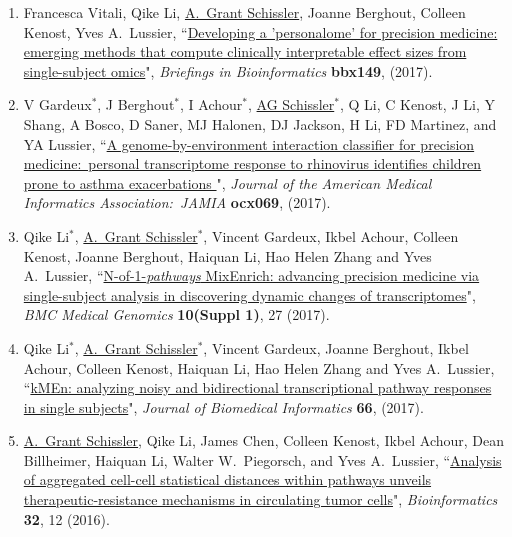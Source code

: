 \documentclass[paper=a4,fontsize=11pt]{scrartcl} %
\newcommand{\PaperEntry}[7]{
		\noindent #1, ``\href{#7}{#2}", \textit{#3} \textbf{#4}, #5 (#6).}
\begin{document}
\begin{enumerate}
\item \PaperEntry{Francesca Vitali, Qike Li, \underline{A.~Grant Schissler}, Joanne Berghout, Colleen Kenost, Yves A.~Lussier}{Developing a 'personalome' for precision medicine: emerging methods that compute clinically interpretable effect sizes from single-subject omics}{Briefings in Bioinformatics}{bbx149}{}{2017}{https://academic.oup.com/bib/advance-article/doi/10.1093/bib/bbx149/4758622}

  \item \PaperEntry{V Gardeux$^{*}$, J Berghout$^{*}$, I Achour$^{*}$, \underline{AG Schissler}$^{*}$, Q Li, C Kenost, J Li, Y Shang, A Bosco, D Saner, MJ Halonen, DJ Jackson, H Li, FD Martinez, and YA Lussier}{A genome-by-environment interaction classifier for precision medicine:~personal transcriptome response to rhinovirus identifies children prone to asthma exacerbations
}{Journal of the American Medical Informatics Association:~JAMIA}{ocx069}{}{2017}{https://academic.oup.com/jamia/article-abstract/doi/10.1093/jamia/ocx069/4004728/A-genome-by-environment-interaction-classifier-for?redirectedFrom=fulltext}

\item \PaperEntry{Qike Li$^{*}$, \underline{A.~Grant Schissler$^{*}$}, Vincent Gardeux, Ikbel Achour, Colleen Kenost, Joanne Berghout, Haiquan Li, Hao Helen Zhang and Yves A.~Lussier}{N-of-1-\emph{pathways} MixEnrich: advancing precision medicine via single-subject analysis in discovering dynamic changes of transcriptomes}{BMC Medical Genomics}{10(Suppl 1)}{27}{2017}{https://bmcmedgenomics.biomedcentral.com/articles/10.1186/s12920-017-0263-4}

\item \PaperEntry{Qike Li$^{*}$, \underline{A.~Grant Schissler}$^{*}$, Vincent Gardeux, Joanne Berghout, Ikbel Achour, Colleen Kenost, Haiquan Li, Hao Helen Zhang and Yves A.~Lussier}{kMEn: analyzing noisy and bidirectional transcriptional pathway responses in single subjects}{Journal of Biomedical Informatics}{66}{}{2017}{http://www.sciencedirect.com/science/article/pii/S1532046416301836}

\item \PaperEntry{\underline{A.~Grant Schissler}, Qike Li, James Chen, Colleen Kenost, Ikbel Achour, Dean Billheimer, Haiquan Li, Walter W.~Piegorsch, and Yves A.~Lussier}{Analysis of aggregated cell-cell statistical distances within pathways unveils therapeutic-resistance mechanisms in circulating tumor cells}{Bioinformatics}{32}{12}{2016}{http://bioinformatics.oxfordjournals.org/content/32/12/i80.full}


\end{enumerate}
\end{document}
